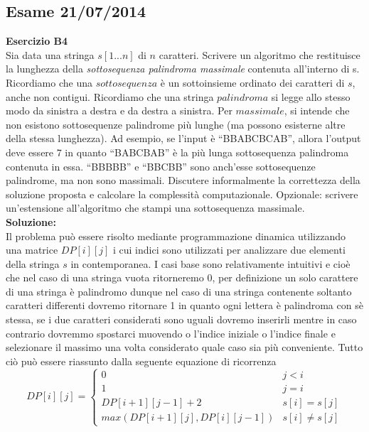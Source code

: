 \documentclass[../cheatSheetAlgoritmi.tex]{subfiles}
\begin{document}
\subsection{Esame 21/07/2014}
\textbf{Esercizio B4}\\
Sia data una stringa $s[1...n]$ di $n$ caratteri. Scrivere un algoritmo che restituisce la lunghezza della \emph{sottosequenza palindroma massimale} contenuta all'interno di s. Ricordiamo che una $sottosequenza$ è un sottoinsieme ordinato dei caratteri di $s$, anche non contigui. Ricordiamo che una stringa $palindroma$ si legge allo stesso modo da sinistra a destra e da destra a sinistra. Per $massimale$, si intende che non esistono sottosequenze palindrome più lunghe (ma possono esisterne altre della stessa lunghezza). Ad esempio, se l'input è “BBABCBCAB”, allora l'output deve essere 7 in quanto “BABCBAB” è la più lunga sottosequenza palindroma contenuta in essa. “BBBBB” e “BBCBB” sono anch'esse sottosequenze palindrome, ma non sono massimali. Discutere informalmente la correttezza della soluzione proposta e calcolare la complessità computazionale. Opzionale: scrivere un'estensione all'algoritmo che stampi una sottosequenza massimale.\\
\textbf{Soluzione:}\\
Il problema può essere risolto mediante programmazione dinamica utilizzando una matrice $DP[i][j]$ i cui indici sono utilizzati per analizzare due elementi della stringa $s$ in contemporanea. I casi base sono relativamente intuitivi e cioè che nel caso di una stringa vuota ritorneremo 0, per definizione un solo carattere di una stringa è palindromo dunque nel caso di una stringa contenente soltanto caratteri differenti dovremo ritornare 1 in quanto ogni lettera è palindroma con sè stessa, se i due caratteri considerati sono uguali dovremo inserirli mentre in caso contrario dovremmo spostarci muovendo o l'indice iniziale o l'indice finale e selezionare il massimo una volta considerato quale caso sia più conveniente. Tutto ciò può essere riassunto dalla seguente equazione di ricorrenza
\begin{equation*}
  	DP[i][j]=\begin{cases}
  		0 & \text{$j < i$}\\
  		1 & \text{$j = i$}\\
  		DP[i+1][j-1] + 2 &\text{$s[i] = s[j]$}\\
  		max(DP[i+1][j], DP[i][j-1]) & \text{$s[i] \neq s[j]$}
  	\end{cases}
\end{equation*}
\end{document}
